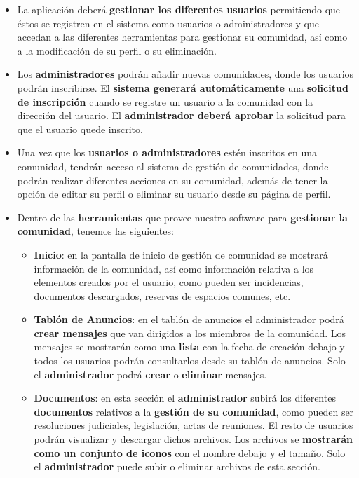 \begin{itemize}
	\item La aplicación deberá \textbf{gestionar los diferentes usuarios} permitiendo que éstos se registren en el sistema como usuarios o administradores y que accedan a las diferentes herramientas para gestionar su comunidad, así como a la modificación de su perfil o su eliminación.
	
 	\item Los \textbf{administradores} podrán añadir nuevas comunidades, donde los usuarios podrán inscribirse. El \textbf{sistema generará automáticamente} una \textbf{solicitud de inscripción} cuando se registre un usuario a la comunidad con la dirección del usuario. El \textbf{administrador deberá aprobar} la solicitud para que el usuario quede inscrito.
 	
 	\item Una vez que los \textbf{usuarios o administradores} estén inscritos en una comunidad, tendrán acceso al sistema de gestión de comunidades, donde podrán realizar diferentes acciones en su comunidad, además de tener la opción de editar su perfil o eliminar su usuario desde su página de perfil. 
 	
 	\item Dentro de las \textbf{herramientas} que provee nuestro software para \textbf{gestionar la comunidad}, tenemos las siguientes:
 	
 	\begin{itemize}
 		\item \textbf{Inicio}: en la pantalla de inicio de gestión de comunidad se mostrará información de la comunidad, así como información relativa a los elementos creados por el usuario, como pueden ser incidencias, documentos descargados, reservas de espacios comunes, etc.
 		
 		\item \textbf{Tablón de Anuncios}: en el tablón de anuncios el administrador podrá \textbf{crear mensajes} que van dirigidos a los miembros de la comunidad. Los mensajes se mostrarán como una \textbf{lista} con la fecha de creación debajo y todos los usuarios podrán consultarlos desde su tablón de anuncios. Solo el \textbf{administrador} podrá \textbf{crear} o \textbf{eliminar} mensajes. 
 		
 		\item \textbf{Documentos}: en esta sección el \textbf{administrador} subirá los diferentes \textbf{documentos} relativos a la \textbf{gestión de su comunidad}, como pueden ser resoluciones judiciales, legislación, actas de reuniones. El resto de usuarios podrán visualizar y descargar dichos archivos. Los archivos se \textbf{mostrarán como un conjunto de iconos} con el nombre debajo y el tamaño. Solo el \textbf{administrador} puede subir o eliminar archivos de esta sección.
 		

\end{itemize}
\end{itemize}
